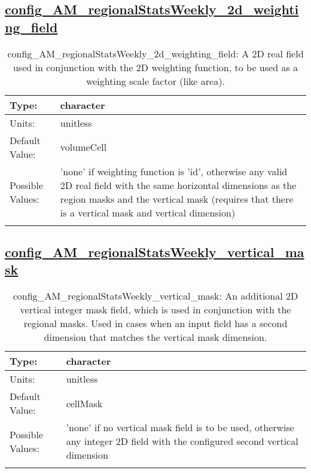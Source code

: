 \subsection[config\_AM\_regionalStatsWeekly\_2d\_weighting\_field]{\hyperref[sec:nm_tab_AM_regionalStatsWeekly]{config\_AM\_regionalStatsWeekly\_2d\_weighting\_field}}
\label{subsec:nm_sec_config_AM_regionalStatsWeekly_2d_weighting_field}
\begin{center}
\begin{longtable}{| p{2.0in} || p{4.0in} |}
    \hline
    Type: & character \\
    \hline
    Units: & \si{unitless} \\
    \hline
    Default Value: & volumeCell \\
    \hline
    Possible Values: & 'none' if weighting function is 'id', otherwise any valid 2D real field with the same horizontal dimensions as the region masks and the vertical mask (requires that there is a vertical mask and vertical dimension) \\
    \hline
    \caption{config\_AM\_regionalStatsWeekly\_2d\_weighting\_field: A 2D real field used in conjunction with the 2D weighting function, to be used as a weighting scale factor (like area).}
\end{longtable}
\end{center}
\subsection[config\_AM\_regionalStatsWeekly\_vertical\_mask]{\hyperref[sec:nm_tab_AM_regionalStatsWeekly]{config\_AM\_regionalStatsWeekly\_vertical\_mask}}
\label{subsec:nm_sec_config_AM_regionalStatsWeekly_vertical_mask}
\begin{center}
\begin{longtable}{| p{2.0in} || p{4.0in} |}
    \hline
    Type: & character \\
    \hline
    Units: & \si{unitless} \\
    \hline
    Default Value: & cellMask \\
    \hline
    Possible Values: & 'none' if no vertical mask field is to be used, otherwise any integer 2D field with the configured second vertical dimension \\
    \hline
    \caption{config\_AM\_regionalStatsWeekly\_vertical\_mask: An additional 2D vertical integer mask field, which is used in conjunction with the regional masks. Used in cases when an input field has a second dimension that matches the vertical mask dimension.}
\end{longtable}
\end{center}
